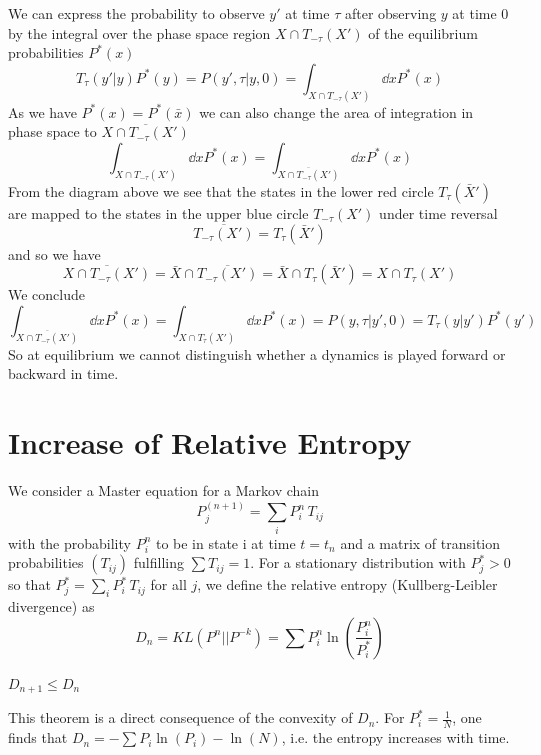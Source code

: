 \documentclass{/home/ben/Templates/notebook}
\begin{document}
	We can express the probability to observe $y'$ at time $\tau$ after observing $y$ at time $0$ by the integral over the phase space region $X \cap T_{-\tau}(X')$ of the equilibrium probabilities $P^*(x)$
	\begin{equation*}
		T_{\tau}(y'|y) P^*(y) = P(y',\tau | y,0) = \int_{X \cap T_{-\tau}(X')} \dd{x} P^*(x) 	
	\end{equation*}
	As we have $P^*(x) = P^*(\bar{x})$ we can also change the area of integration in phase space to $\overline{X \cap T_{-\tau}(X')}$
	\begin{equation*}
		\int_{X \cap T_{-\tau}(X')} \dd{x} P^*(x) = \int_{\overline{X \cap T_{-\tau}(X')}} \dd{x} P^*(x)
	\end{equation*}
	From the diagram above we see that the states in the lower red circle $T_{\tau}(\bar{X}')$ are mapped to the states in the upper blue circle $T_{-\tau}(X')$ under time reversal
	\begin{equation}
	\overline{T_{-\tau}(X')} = T_{\tau}(\bar{X}')
	\end{equation}
	and so we have
	\begin{equation}
	\overline{X \cap T_{-\tau}(X')} = \bar{X} \cap \overline{T_{-\tau}(X')} = \bar{X} \cap T_{\tau}(\bar{X}') = X \cap T_{\tau}(X')
	\end{equation}
	We conclude
	\begin{equation}
	\int_{\overline{X \cap T_{-\tau}(X')}} \dd{x} P^*(x) 
	= \int_{X \cap T_{\tau}(X')} \dd{x} P^*(x) 
	= P(y, \tau | y', 0) = T_{\tau}(y|y') P^*(y')
	\end{equation}
	So at equilibrium we cannot distinguish whether a dynamics is played forward or backward in time.
	
	\section{Increase of Relative Entropy}
	
	We consider a Master equation for a Markov chain
	\begin{equation}
	P_j^{(n+1)} = \sum_i{P_i^n \, T_{ij}}
	\end{equation}
	with the probability $P_i^n$ to be in state i at time $t = t_n$ and a matrix of transition probabilities $\left( T_{ij} \right)$ fulfilling $\sum T_{ij} = 1$. For a stationary distribution with $P_j^* > 0$ so that $P_j^* = \sum_i P_i^* \, T_{ij}$ for all $j$, we define the relative entropy (Kullberg-Leibler divergence) as
	\begin{equation}
	D_n = K L(P^n||P^{-k}) = \sum P_i^n \ln \left( \frac{P_i^n}{P_i^*} \right)
	\end{equation}
	\begin{theorem}[Theorem]
		$D_{n+1} \leq D_n$
	\end{theorem}
	This theorem is a direct consequence of the convexity of $D_n$. For $P_i^* = \frac{1}{N}$, one finds that $D_n = -\sum P_i \ln(P_i) - \ln(N)$, i.e. the entropy increases with time.
	
\end{document}
